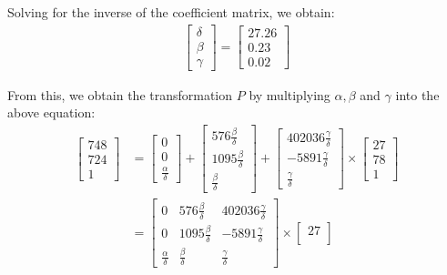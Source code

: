 \documentclass[12pt, oneside]{article}
\begin{document}
Solving for the inverse of the coefficient matrix, we obtain:
\begin{align*}
\begin{bmatrix}
\delta \\
\beta \\
\gamma
\end{bmatrix} = 
\begin{bmatrix}
27.26    \\
0.23    \\
0.02
\end{bmatrix} 
\end{align*}
  
From this, we obtain the transformation $P$ by multiplying $\alpha, \beta$ and $\gamma$ into the above equation:
\begin{align*}
  \begin{bmatrix}
748   \\
724   \\
1  
\end{bmatrix}  &= \begin{bmatrix}
0  \\
0   \\
\frac{\alpha}{\delta} 
\end{bmatrix} +
 \begin{bmatrix}
576\frac{\beta}{\delta}  \\
1095 \frac{\beta}{\delta}  \\
\frac{\beta}{\delta}  
\end{bmatrix} +  \begin{bmatrix}
    402036 \frac{\gamma}{\delta} \\
    -5891\frac{\gamma}{\delta} \\
    \frac{\gamma}{\delta}
\end{bmatrix} \times 
\begin{bmatrix}
    27 \\
    78 \\
    1 
\end{bmatrix} \\
 &= \begin{bmatrix}
    0   &  576\frac{\beta}{\delta}  &  402036 \frac{\gamma}{\delta} \\
    0   &  1095 \frac{\beta}{\delta} & -5891\frac{\gamma}{\delta} \\
    \frac{\alpha}{\delta}  &  \frac{\beta}{\delta}   & \frac{\gamma}{\delta}
    \end{bmatrix} 
\times 
    \begin{bmatrix}
        27 \\

\end{bmatrix}
\end{align*}
\end{document}
